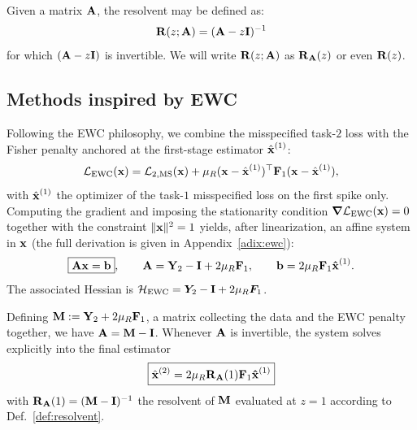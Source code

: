 \documentclass[11pt]{article}
\begin{document}
\begin{defn}
    Given a matrix $\boldsymbol{\mathbf{A}}$, the resolvent may be defined as:
    \begin{equation}
        \boldsymbol{\mathbf{R}}(z; \boldsymbol{\mathbf{A}}) = (\boldsymbol{\mathbf{A}} - z\boldsymbol{\mathbf{I}})^{-1}
        \label{resolvent}
    \end{equation}
    for which $(\boldsymbol{\mathbf{A}} - z\boldsymbol{\mathbf{I}})$ is invertible. We will write $\boldsymbol{\mathbf{R}}(z; \boldsymbol{\mathbf{A}})$ as $\boldsymbol{\mathbf{R}}_{\boldsymbol{\mathbf{A}}}(z)$ or even $\boldsymbol{\mathbf{R}}(z)$.
    \label{def:resolvent}
\end{defn}


\subsection{Methods inspired by EWC}
Following the EWC philosophy, we combine the misspecified task-$2$ loss with the Fisher penalty anchored at the first-stage estimator $\hat{\boldsymbol{\mathbf{x}}}^{(1)}$:
\[
    \mathcal L_{\mathrm{EWC}}(\boldsymbol{\mathbf{x}}) = \mathcal{L}_{\mathrm{2,MS}}(\boldsymbol{\mathbf{x}}) + \mu_R (\boldsymbol{\mathbf{x}} - \hat{\boldsymbol{\mathbf{x}}}^{(1)})^\top \boldsymbol{\mathbf{F}}_1(\boldsymbol{\mathbf{x}} - \hat{\boldsymbol{\mathbf{x}}}^{(1)}),
\]
with $\hat{\boldsymbol{\mathbf{x}}}^{(1)}$ the optimizer of the task-$1$ misspecified loss on the first spike only. Computing the gradient and imposing the stationarity condition $\boldsymbol{\mathbf{\nabla}} \mathcal L_{\mathrm{EWC}}(\boldsymbol{\mathbf{x}})=0$ together with the constraint $ \|\boldsymbol{\mathbf{x}} \|^2=1$ yields, after linearization, an affine system in $\boldsymbol{\mathbf{x}}$ (the full derivation is given in Appendix~\ref{adix:ewc}):
\begin{equation}
    \boxed{\boldsymbol{\mathbf{A}} \boldsymbol{\mathbf{x}} = \boldsymbol{\mathbf{b}}}, \qquad
    \boldsymbol{\mathbf{A}} = \boldsymbol{\mathbf{Y}}_2 -\boldsymbol{\mathbf{I}} + 2\mu_R \boldsymbol{\mathbf{F}}_1, \qquad
    \boldsymbol{\mathbf{b}} = 2\mu_R \boldsymbol{\mathbf{F}}_1\boldsymbol{\mathbf{\hat x}}^{(1)}.
    \label{eq:stationary_condition}
\end{equation}
The associated Hessian is $\mathcal{H_{\text{EWC}}} = \bm{Y}_2 - \boldsymbol{\mathbf{I}}  + 2 \mu_R \bm{F}_1$.


\noindent
Defining $\boldsymbol{\mathbf{M}} :=\boldsymbol{\mathbf{Y}}_2 + 2\mu_R \boldsymbol{\mathbf{F}}_1$, a matrix collecting the data and the EWC penalty together, we have $\boldsymbol{\mathbf{A}} =\boldsymbol{\mathbf{M}} - \boldsymbol{\mathbf{I}}$. Whenever $\boldsymbol{\mathbf{A}}$ is invertible, the system solves explicitly into the final estimator
\begin{equation}
    \boxed{
    \hat{\boldsymbol{\mathbf{x}}}^{(2)} = 2\mu_R \boldsymbol{\mathbf{R}}_{\boldsymbol{\mathbf{A}}}(1)\boldsymbol{\mathbf{F}}_1 \boldsymbol{\mathbf{\hat x}}^{(1)}}
    \label{eq:final_estimator}
\end{equation}
with $\boldsymbol{\mathbf{R}}_{\boldsymbol{\mathbf{A}}}(1) = (\boldsymbol{\mathbf{M}} - \boldsymbol{\mathbf{I}}) ^{-1}$ the resolvent of $\boldsymbol{\mathbf{M}}$ evaluated at $z = 1$ according to Def.~\ref{def:resolvent}.
\end{document}
